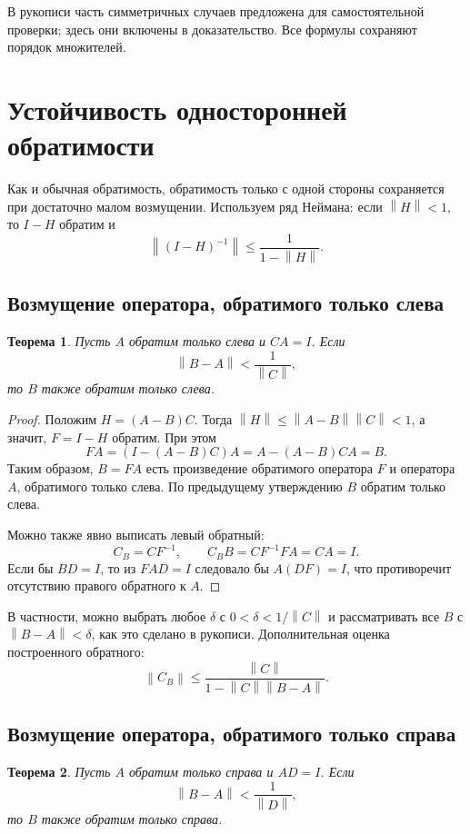 \documentclass[12pt,a4paper]{article}
\newtheorem{theorem}{Теорема}
\theoremstyle{definition}
\theoremstyle{remark}
\newcommand{\norm}[1]{\left\lVert #1\right\rVert}
\begin{document}
В рукописи часть симметричных случаев предложена для самостоятельной
проверки; здесь они включены в доказательство. Все формулы сохраняют
порядок множителей.

\section{Устойчивость односторонней обратимости}

Как и обычная обратимость, обратимость только с одной стороны
сохраняется при достаточно малом возмущении. Используем ряд Неймана:
если $\norm{H}<1$, то $I-H$ обратим и
\[
  \norm{(I-H)^{-1}}\leqslant\frac1{1-\norm{H}}.
\]

\subsection{Возмущение оператора, обратимого только слева}

\begin{theorem}
Пусть $A$ обратим только слева и $CA=I$. Если
\[
  \norm{B-A}<\frac1{\norm{C}},
\]
то $B$ также обратим только слева.
\end{theorem}

\begin{proof}
Положим $H=(A-B)C$. Тогда $\norm{H}\leqslant\norm{A-B}\norm{C}<1$,
а значит, $F=I-H$ обратим. При этом
\[
  FA=(I-(A-B)C)A=A-(A-B)CA=B.
\]
Таким образом, $B=FA$ есть произведение обратимого оператора $F$
и оператора $A$, обратимого только слева. По предыдущему утверждению
$B$ обратим только слева.

Можно также явно выписать левый обратный:
\[
  C_B=CF^{-1},\qquad C_BB=CF^{-1}FA=CA=I.
\]
Если бы $BD=I$, то из $FAD=I$ следовало бы $A(DF)=I$,
что противоречит отсутствию правого обратного к $A$.
\end{proof}

В частности, можно выбрать любое $\delta$ с
$0<\delta<1/\norm{C}$ и рассматривать все $B$ с
$\norm{B-A}<\delta$, как это сделано в рукописи.
Дополнительная оценка построенного обратного:
\[
  \norm{C_B}\leqslant
  \frac{\norm{C}}{1-\norm{C}\norm{B-A}}.
\]

\subsection{Возмущение оператора, обратимого только справа}

\begin{theorem}
Пусть $A$ обратим только справа и $AD=I$. Если
\[
  \norm{B-A}<\frac1{\norm{D}},
\]
то $B$ также обратим только справа.
\end{theorem}
\end{document}
